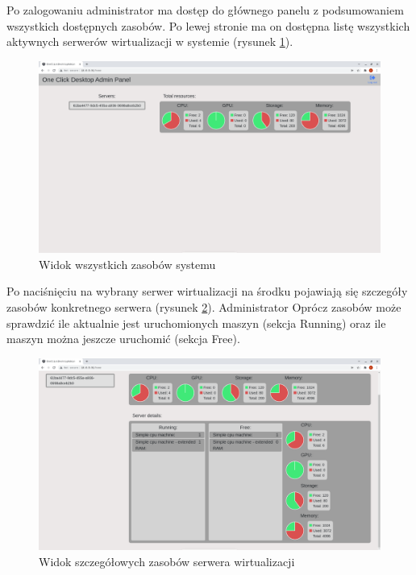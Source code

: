 \documentclass[../opis-rozwiazania.tex]{subfiles}
\begin{document}
Po zalogowaniu administrator ma dostęp do głównego panelu z podsumowaniem wszystkich dostępnych zasobów.
Po lewej stronie ma on dostępna listę wszystkich aktywnych serwerów wirtualizacji w systemie (rysunek \ref{figure:system_interaction.admin.panel}).

\begin{figure}[h!]
  \centering
  \includegraphics[width=\textwidth]{resources/admin_panel_home.png}
  \caption{Widok wszystkich zasobów systemu}
  \label{figure:system_interaction.admin.panel}
\end{figure}

Po naciśnięciu na wybrany serwer wirtualizacji na środku pojawiają się szczegóły zasobów konkretnego serwera (rysunek \ref{figure:system_interaction.admin.details}).
Administrator Oprócz zasobów może sprawdzić ile aktualnie jest uruchomionych maszyn (sekcja Running) oraz ile maszyn można jeszcze uruchomić (sekcja Free).

\begin{figure}[h!]
  \centering
  \includegraphics[width=\textwidth]{resources/admin_panel_details.png}
  \caption{Widok szczegółowych zasobów serwera wirtualizacji}
  \label{figure:system_interaction.admin.details}
\end{figure}
\end{document}
